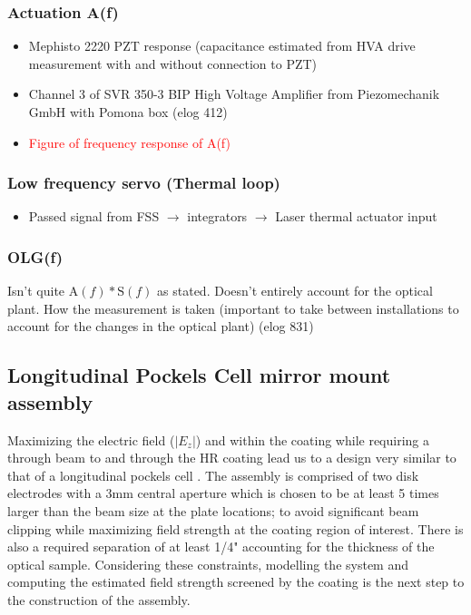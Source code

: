 \subsubsection{Actuation A(f)}
\begin{itemize}
\item Mephisto 2220 PZT response (capacitance estimated from HVA drive measurement with and without connection to PZT)
\item Channel 3 of SVR 350-3 BIP High Voltage Amplifier from Piezomechanik GmbH with Pomona box (elog 412)
\item \textcolor{red}{Figure of frequency response of A(f)}

\end{itemize}

\subsubsection{Low frequency servo (Thermal loop)}
\begin{itemize}
\item Passed signal from FSS $\rightarrow$ integrators $\rightarrow$ Laser thermal actuator input
\end{itemize}

\subsubsection{OLG(f)}
Isn't quite $\mathrm{A}(f)*\mathrm{S}(f)$ as stated. Doesn't entirely account for the optical plant.
How the measurement is taken (important to take between installations to account for the changes in the optical plant) (elog 831)


\subsection{Longitudinal Pockels Cell mirror mount assembly}
Maximizing the electric field ($|E_z|$) and within the coating while requiring a through beam to and through the HR coating lead us to a design very similar to that of a longitudinal pockels cell \cite{}. The assembly is comprised of two disk electrodes with a 3mm central aperture which is chosen to be at least 5 times larger than the beam size at the plate locations; to avoid significant beam clipping while maximizing field strength at the coating region of interest. There is also a required separation of at least 1/4" accounting for the thickness of the optical sample. Considering these constraints, modelling the system and computing the estimated field strength screened by the coating is the next step to the construction of the assembly.

